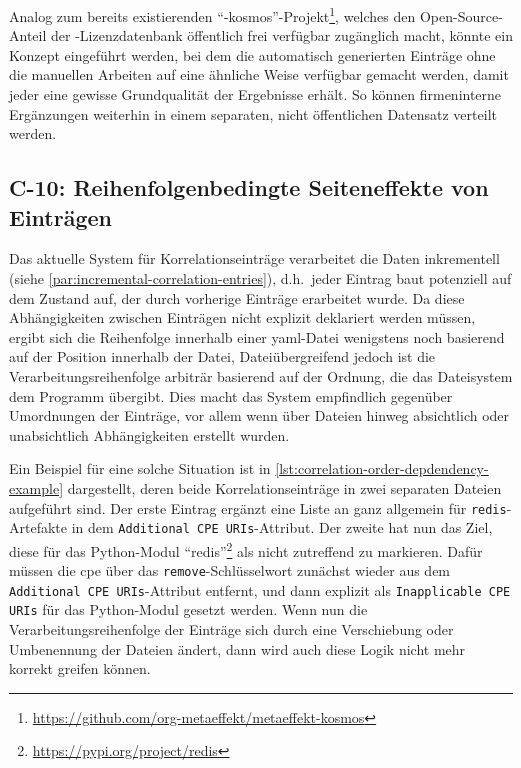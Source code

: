 Analog zum bereits existierenden \enquote{\metaeffekt-kosmos}-Projekt\footnote{\url{https://github.com/org-metaeffekt/metaeffekt-kosmos}}, welches den Open-Source-Anteil der \metaeffekt-Lizenzdatenbank öffentlich frei verfügbar zugänglich macht, könnte ein Konzept eingeführt werden, bei dem die automatisch generierten Einträge ohne die manuellen Arbeiten auf eine ähnliche Weise verfügbar gemacht werden, damit jeder eine gewisse Grundqualität der Ergebnisse erhält.
So können firmeninterne Ergänzungen weiterhin in einem separaten, nicht öffentlichen Datensatz verteilt werden.

\subsection{C-10: Reihenfolgenbedingte Seiteneffekte von Einträgen}\label{subsec:c-10-order-dependency}


Das aktuelle System für Korrelationseinträge verarbeitet die Daten inkrementell (siehe \autoref{par:incremental-correlation-entries}), d.h.\ jeder Eintrag baut potenziell auf dem Zustand auf, der durch vorherige Einträge erarbeitet wurde.
Da diese Abhängigkeiten zwischen Einträgen nicht explizit deklariert werden müssen, ergibt sich die Reihenfolge innerhalb einer \acrshort{yaml}-Datei wenigstens noch basierend auf der Position innerhalb der Datei, Dateiübergreifend jedoch ist die Verarbeitungsreihenfolge arbiträr basierend auf der Ordnung, die das Dateisystem dem Programm übergibt.
Dies macht das System empfindlich gegenüber Umordnungen der Einträge, vor allem wenn über Dateien hinweg absichtlich oder unabsichtlich Abhängigkeiten erstellt wurden.

Ein Beispiel für eine solche Situation ist in \autoref{lst:correlation-order-depdendency-example} dargestellt, deren beide Korrelationseinträge in zwei separaten Dateien aufgeführt sind.
Der erste Eintrag ergänzt eine Liste an  ganz allgemein für \texttt{redis}-Artefakte in dem \texttt{Additional CPE URIs}-Attribut.
Der zweite hat nun das Ziel, diese für das Python-Modul \enquote{redis}\footnote{\url{https://pypi.org/project/redis}} als nicht zutreffend zu markieren.
Dafür müssen die \acrshort{cpe} über das \texttt{remove}-Schlüsselwort zunächst wieder aus dem \texttt{Additional CPE URIs}-Attribut entfernt, und dann explizit als \texttt{Inapplicable CPE URIs} für das Python-Modul gesetzt werden.
Wenn nun die Verarbeitungsreihenfolge der Einträge sich durch eine Verschiebung oder Umbenennung der Dateien ändert, dann wird auch diese Logik nicht mehr korrekt greifen können.

